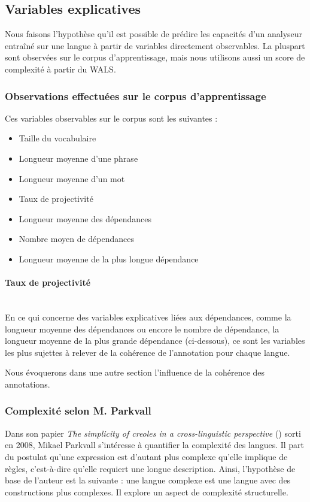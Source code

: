 \documentclass[a4paper, twoside, 12pt]{article}
\newcommand{\myparagraph}[1]{\paragraph{#1}\mbox{}\\}
\begin{document}
    \subsection{Variables explicatives}

    Nous faisons l'hypothèse qu'il est possible de prédire les capacités d'un analyseur entraîné sur une langue à partir de variables directement observables. La pluspart sont observées sur le corpus d'apprentissage, mais nous utilisons aussi un score de complexité à partir du WALS.

        \subsubsection{Observations effectuées sur le corpus d'apprentissage}
Ces variables observables sur le corpus sont les suivantes :

    \begin{itemize}
        \item Taille du vocabulaire
        \item Longueur moyenne d'une phrase
        \item Longueur moyenne d'un mot
        \item Taux de projectivité
        \item Longueur moyenne des dépendances
        \item Nombre moyen de dépendances
        \item Longueur moyenne de la plus longue dépendance
    \end{itemize}

\myparagraph{Taux de projectivité}

    

    En ce qui concerne des variables explicatives liées aux dépendances, comme la longueur moyenne des dépendances ou encore le nombre de dépendance, la longueur moyenne de la plus grande dépendance (ci-dessous), ce sont les variables les plus sujettes à relever de la cohérence de l'annotation pour chaque langue.
    
    Nous évoquerons dans une autre section l'influence de la cohérence des annotations.

    \subsubsection{Complexité selon M. Parkvall}

    Dans son papier \textit{The simplicity of creoles in a cross-linguistic perspective} (\cite{parkvall}) sorti en 2008, Mikael Parkvall s’intéresse à quantifier la complexité des langues. Il part du postulat qu’une expression est d’autant plus complexe qu’elle implique de règles, c’est-à-dire qu’elle requiert une longue description. Ainsi, l'hypothèse de base de l’auteur est la suivante : une langue complexe est une langue avec des constructions plus complexes. Il explore un aspect de complexité structurelle.
\end{document}
